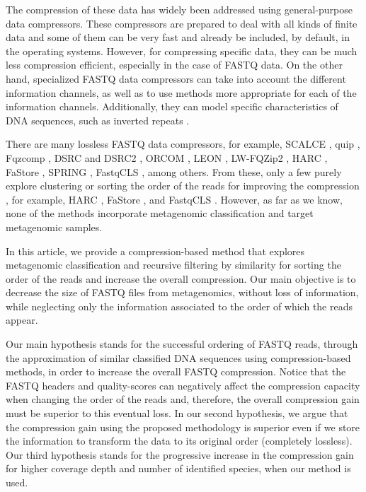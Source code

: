 \documentclass[smallabstract,smallcaptions]{dccpaper}
\begin{document}
The compression of these data has widely been addressed using general-purpose data compressors. These compressors are prepared to deal with all kinds of finite data and some of them can be very fast and already be included, by default, in the operating systems. However, for compressing specific data, they can be much less compression efficient, especially in the case of FASTQ data. On the other hand, specialized FASTQ data compressors can take into account the different information channels, as well as to use methods more appropriate for each of the information channels. Additionally, they can model specific characteristics of DNA sequences, such as inverted repeats \cite{hosseini2016survey}.

There are many lossless FASTQ data compressors, for example, SCALCE \cite{hach2012scalce}, quip \cite{jones2012compression}, Fqzcomp \cite{bonfield2013compression}, DSRC and DSRC2 \cite{roguski2014dsrc}, ORCOM \cite{grabowski2015disk}, LEON \cite{benoit2015reference},  LW-FQZip2 \cite{huang2017lw}, HARC \cite{chandak2018compression}, FaStore \cite{roguski2018fastore}, SPRING \cite{chandak2019spring}, FastqCLS \cite{lee2022fastqcls}, among others. From these, only a few purely explore clustering or sorting the order of the reads for improving the compression \cite{wan2010sorting}, for example, HARC \cite{chandak2018compression}, FaStore \cite{roguski2018fastore}, and FastqCLS \cite{lee2022fastqcls}. However, as far as we know, none of the methods incorporate metagenomic classification and target metagenomic samples.

In this article, we provide a compression-based method that explores metagenomic classification and recursive filtering by similarity for sorting the order of the reads and increase the overall compression. Our main objective is to decrease the size of FASTQ files from metagenomics, without loss of information, while neglecting only the information associated to the order of which the reads appear.

Our main hypothesis stands for the successful ordering of FASTQ reads, through the approximation of similar classified DNA sequences using compression-based methods, in order to increase the overall FASTQ compression. Notice that the FASTQ headers and quality-scores can negatively affect the compression capacity when changing the order of the reads and, therefore, the overall compression gain must be superior to this eventual loss. In our second hypothesis, we argue that the compression gain using the proposed methodology is superior even if we store the information to transform the data to its original order (completely lossless). Our third hypothesis stands for the progressive increase in the compression gain for higher coverage depth and number of identified species, when our method is used.
\end{document}
